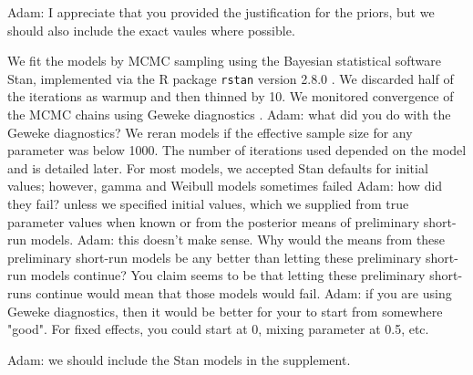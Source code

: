 \documentclass[useAMS,usenatbib,referee,12pt]{article}
\newcommand{\jarad}[1]{{\color{Orange} #1}}
\newcommand{\vX}{\textbf{X}}
\newcommand{\vZ}{\textbf{Z}}
\newcommand{\vbeta}{\boldsymbol{\beta}}
\newcommand{\vxi}{\boldsymbol{\xi}}
\begin{document}
\jarad{Adam: I appreciate that you provided the justification for the priors, but we should also include the exact vaules where possible.}


We fit the models by MCMC sampling using the Bayesian statistical software Stan, implemented via the R package \texttt{rstan} version 2.8.0 \citep{Rstan2015}.  
We discarded half of the iterations as warmup and then thinned by 10.  
We monitored convergence of the MCMC chains using Geweke diagnostics \citep{Geweke1991}. \jarad{Adam: what did you do with the Geweke diagnostics?}  
We reran models if the effective sample size for any parameter was below 1000.  
The number of iterations used depended on the model and is detailed later. 
For most models, we accepted Stan defaults for initial values; however, gamma and Weibull models sometimes failed \jarad{Adam: how did they fail?} unless we specified initial values, which we supplied from true parameter values when known or from the posterior means of preliminary short-run models. \jarad{Adam: this doesn't make sense. Why would the means from these preliminary short-run models be any better than letting these preliminary short-run models continue? You claim seems to be that letting these preliminary short-runs continue would mean that those models would fail.}
\jarad{Adam: if you are using Geweke diagnostics, then it would be better for your to start from somewhere "good". For fixed effects, you could start at 0, mixing parameter at 0.5, etc.} 




\jarad{Adam: we should include the Stan models in the supplement.}


\end{document}
